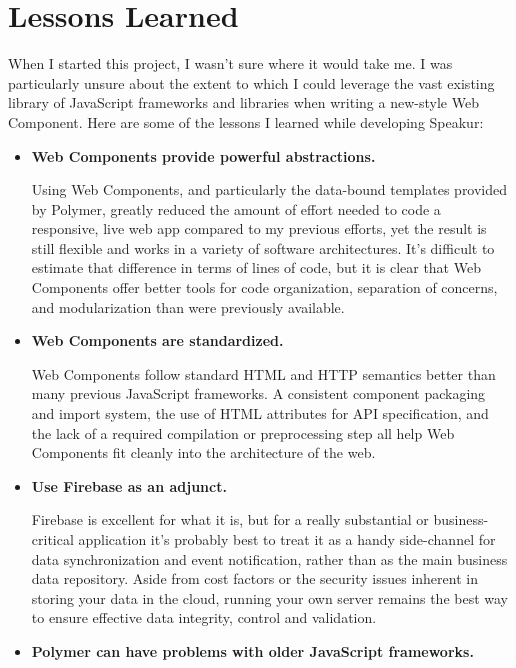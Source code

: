 \section{Lessons Learned}
When I started this project, I wasn't sure where it would take me. 
I was particularly unsure about the extent to which I could leverage the vast existing library of JavaScript frameworks and libraries when writing a new-style Web Component. Here are some of the lessons I learned while developing Speakur:
\begingroup
{}
\begin{itemize}
\item \textbf{Web Components provide powerful abstractions.}

Using Web Components, and particularly the data-bound templates provided by Polymer, greatly reduced the amount of effort needed to code a responsive, live web app compared to my previous efforts, 
yet the result is still flexible and works in a variety of software architectures.
It's difficult to estimate that difference in terms of lines of code, but it is clear that Web Components offer better tools for code organization, 
separation of concerns, and modularization than were previously available.

\item \textbf{Web Components are standardized.}

Web Components follow standard HTML and HTTP semantics better than many previous JavaScript frameworks. 
A consistent component packaging and import system, the use of HTML attributes for API specification, 
and the lack of a required compilation or preprocessing step all help Web Components fit cleanly into the architecture of the web.

\item \textbf{Use Firebase as an adjunct.}

Firebase is excellent for what it is, 
but for a really substantial or business-critical application it's probably best to treat it as a handy side-channel for data synchronization and event notification, 
rather than as the main business data repository. 
Aside from cost factors or the security issues inherent in storing your data in the cloud, 
running your own server remains the best way to ensure effective data integrity, control and validation.

\item \textbf{Polymer can have problems with older JavaScript frameworks.}


\end{itemize}
